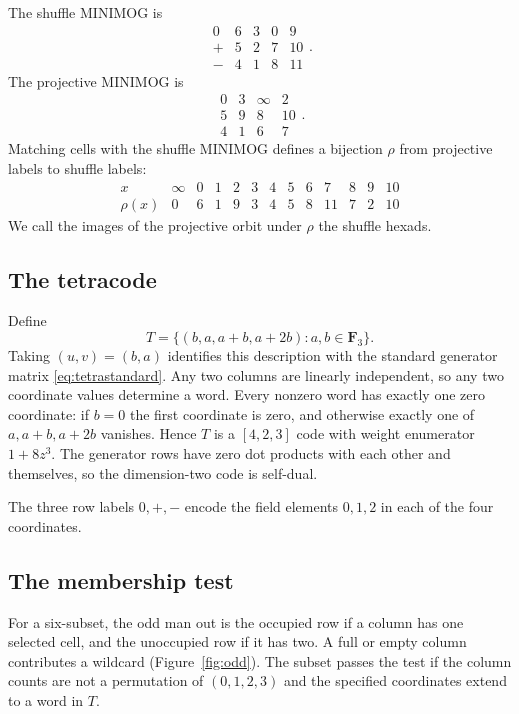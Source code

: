 \documentclass[12pt,letterpaper]{article}
\theoremstyle{definition}\newtheorem{example}[theorem]{Example}
\numberwithin{equation}{section}
\newcommand{\F}{\mathbf F}
\begin{document}
The shuffle MINIMOG is
\begin{equation}\label{eq:shuffle}
\begin{array}{c|rrrr}0&6&3&0&9\\+&5&2&7&10\\-&4&1&8&11\end{array}.
\end{equation}
The projective MINIMOG is
\[
\begin{array}{rrrr}0&3&\infty&2\\5&9&8&10\\4&1&6&7\end{array}.
\]
Matching cells with the shuffle MINIMOG defines a bijection $\rho$ from projective labels to shuffle labels:
\[
\begin{array}{c|rrrrrrrrrrrr}
x&\infty&0&1&2&3&4&5&6&7&8&9&10\\\hline
\rho(x)&0&6&1&9&3&4&5&8&11&7&2&10
\end{array}
\]
We call the images of the projective orbit under $\rho$ the shuffle hexads.

\subsection{The tetracode}
Define
\begin{equation}\label{eq:tetracode}
T=\{(b,a,a+b,a+2b):a,b\in\F_3\}.
\end{equation}
Taking $(u,v)=(b,a)$ identifies this description with the standard generator matrix \eqref{eq:tetrastandard}.
Any two columns are linearly independent, so any two coordinate values determine a word. Every nonzero word has exactly one zero coordinate: if $b=0$ the first coordinate is zero, and otherwise exactly one of $a,a+b,a+2b$ vanishes. Hence $T$ is a $[4,2,3]$ code with weight enumerator $1+8z^3$. The generator rows have zero dot products with each other and themselves, so the dimension-two code is self-dual.

The three row labels $0,+,-$ encode the field elements $0,1,2$ in each of the four coordinates.

\subsection{The membership test}
For a six-subset, the odd man out is the occupied row if a column has one selected cell, and the unoccupied row if it has two. A full or empty column contributes a wildcard (Figure~\ref{fig:odd}). The subset passes the test if the column counts are not a permutation of $(0,1,2,3)$ and the specified coordinates extend to a word in $T$.
\end{document}
